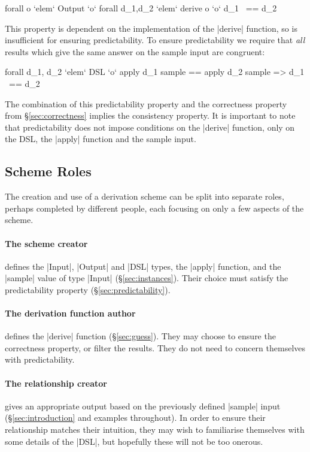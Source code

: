 \documentclass{llncs}
\begin{document}
\ignore\begin{code}
forall o `elem` Output `o` forall d_1,d_2 `elem` derive o `o` d_1 ~== d_2
\end{code}

This property is dependent on the implementation of the |derive| function, so is insufficient for ensuring predictability. To ensure predictability we require that \textit{all} results which give the same answer on the sample input are congruent:

\ignore\begin{code}
forall d_1, d_2 `elem` DSL `o` apply d_1 sample == apply d_2 sample => d_1 ~== d_2
\end{code}

The combination of this predictability property and the correctness property from \S\ref{sec:correctness} implies the consistency property. It is important to note that predictability does not impose conditions on the |derive| function, only on the DSL, the |apply| function and the sample input.

\subsection{Scheme Roles}

The creation and use of a derivation scheme can be split into separate roles, perhaps completed by different people, each focusing on only a few aspects of the scheme.

\paragraph{The scheme creator} defines the |Input|, |Output| and |DSL| types, the |apply| function, and the |sample| value of type |Input| (\S\ref{sec:instances}). Their choice must satisfy the predictability property (\S\ref{sec:predictability}).

\paragraph{The derivation function author} defines the |derive| function (\S\ref{sec:guess}). They may choose to ensure the correctness property, or filter the results. They do not need to concern themselves with predictability.

\paragraph{The relationship creator} gives an appropriate output based on the previously defined |sample| input (\S\ref{sec:introduction} and examples throughout). In order to ensure their relationship matches their intuition, they may wish to familiarise themselves with some details of the |DSL|, but hopefully these will not be too onerous.
\end{document}
